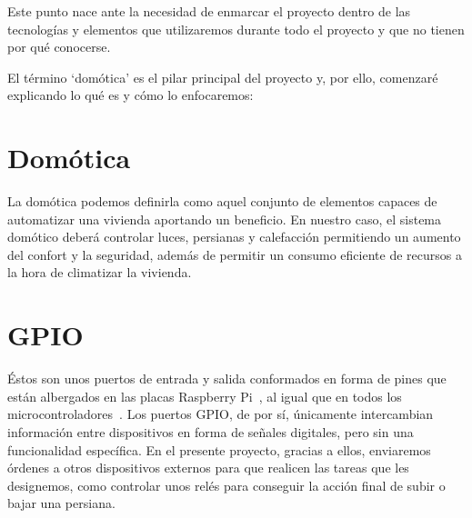 
\label{cap:Conceptos teóricos}

Este punto nace ante la necesidad de enmarcar el proyecto dentro de las tecnologías y elementos que utilizaremos durante todo el proyecto y que no tienen por qué conocerse.

El término `domótica’ es el pilar principal del proyecto y, por ello, comenzaré explicando lo qué es y cómo lo enfocaremos:

\section{Domótica}\label{concepto:Domótica}
La domótica podemos definirla como aquel conjunto de elementos capaces de automatizar una vivienda aportando un beneficio.
En nuestro caso, el sistema domótico deberá controlar luces, persianas y calefacción permitiendo un aumento del confort y la seguridad, además de permitir un consumo eficiente de recursos a la hora de climatizar la vivienda.

\begin{displayquote}
 \cite{inproceedings:CitaDomotica}
\end{displayquote}

\section{GPIO}\label{concepto:GPIO}
Éstos son unos puertos de entrada y salida conformados en forma de pines que están albergados en las placas Raspberry Pi~\cite{misc:RbPWeb}, al igual que en todos los microcontroladores~\cite{misc:descubrearduino}. Los puertos GPIO, de por sí, únicamente intercambian información entre dispositivos en forma de señales digitales, pero sin una funcionalidad específica. En el presente proyecto, gracias a ellos, enviaremos órdenes a otros dispositivos externos para que realicen las tareas que les designemos, como controlar unos relés para conseguir la acción final de subir o bajar una persiana.

